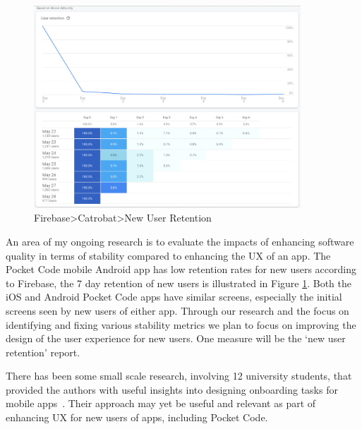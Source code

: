 \begin{figure}[htbp!]
    \centering
    \includegraphics[width=10cm]{images/firebase/Firebase-pocketcode-android-7-day-new-user-retention-29-may-2020.png}
    \caption{Firebase>Catrobat>New User Retention}
    \label{fig:Firebase-pocketcode-android-7-day-new-user-retention-29-may-2020}
\end{figure}

An area of my ongoing research is to evaluate the impacts of enhancing software quality in terms of stability compared to enhancing the UX of an app. The Pocket Code mobile Android app has low retention rates for new users according to Firebase, the 7 day retention of new users is illustrated in Figure \ref{fig:Firebase-pocketcode-android-7-day-new-user-retention-29-may-2020}. Both the iOS and Android Pocket Code apps have similar screens, especially the initial screens seen by new users of either app. Through our research and the focus on identifying and fixing various stability metrics we plan to focus on improving the design of the user experience for new users. One measure will be the `new user retention' report.

There has been some small scale research, involving 12 university students, that provided the authors with useful insights into designing onboarding tasks for mobile apps~\citep{strahm2018_mobile_app_onboarding}. Their approach may yet be useful and relevant as part of enhancing UX for new users of apps, including Pocket Code.

